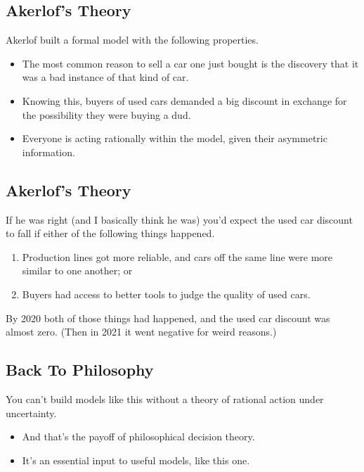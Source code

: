 \documentclass[
  letterpaper,
  DIV=11,
  numbers=noendperiod]{scrartcl}
\providecommand{\tightlist}{%
  \setlength{\itemsep}{0pt}\setlength{\parskip}{0pt}}\usepackage{longtable,booktabs,array}
\begin{document}
\subsection{Akerlof's Theory}\label{akerlofs-theory-1}

Akerlof built a formal model with the following properties.

\begin{itemize}
\tightlist
\item
  The most common reason to sell a car one just bought is the discovery
  that it was a bad instance of that kind of car.
\item
  Knowing this, buyers of used cars demanded a big discount in exchange
  for the possibility they were buying a dud.
\item
  Everyone is acting rationally within the model, given their asymmetric
  information.
\end{itemize}

\subsection{Akerlof's Theory}\label{akerlofs-theory-2}

If he was right (and I basically think he was) you'd expect the used car
discount to fall if either of the following things happened.

\begin{enumerate}
\def\labelenumi{\arabic{enumi}.}
\tightlist
\item
  Production lines got more reliable, and cars off the same line were
  more similar to one another; or
\item
  Buyers had access to better tools to judge the quality of used cars.
\end{enumerate}

By 2020 both of those things had happened, and the used car discount was
almost zero. (Then in 2021 it went negative for weird reasons.)

\subsection{Back To Philosophy}\label{back-to-philosophy}

You can't build models like this without a theory of rational action
under uncertainty.

\begin{itemize}
\tightlist
\item
  And that's the payoff of philosophical decision theory.
\item
  It's an essential input to useful models, like this one.
\end{itemize}
\end{document}
